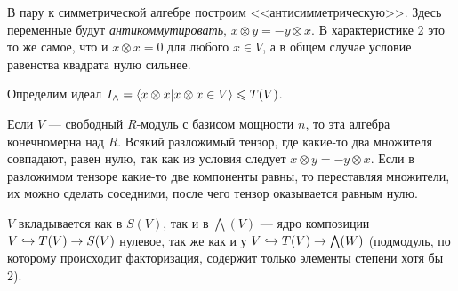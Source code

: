 В пару к симметрической алгебре построим <<антисимметрическую>>.
Здесь переменные будут \emph{антикоммутировать}, $x \otimes y = -y \otimes x$.
В характеристике 2 это то же самое, что и $x \otimes x = 0$ для любого $x \in V$, а в общем случае условие равенства квадрата нулю сильнее.

Определим идеал $I_{\wedge} = \left\langle x \otimes x \middle| x \otimes x \in V\right\rangle\trianglelefteqslant T(V)$.

Если $V$ --- свободный $R$-модуль с базисом мощности $n$, то эта алгебра конечномерна над $R$.
Всякий разложимый тензор, где какие-то два множителя совпадают, равен нулю, так как из условия следует $x \otimes y = -y \otimes x$.
Если в разложимом тензоре какие-то две компоненты равны, то переставляя множители, их можно сделать соседними, после чего тензор оказывается равным нулю.

$V$ вкладывается как в $S(V)$, так и в $\bigwedge(V)$ --- ядро композиции $V \hookrightarrow T(V) \rightarrow S(V)$ нулевое, так же как и у $V \hookrightarrow T(V) \rightarrow \bigwedge(W)$ (подмодуль, по которому происходит факторизация, содержит только элементы степени хотя бы 2).

